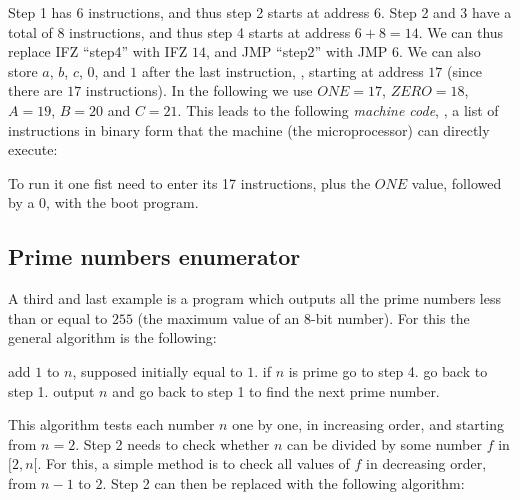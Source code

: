 Step 1 has $6$ instructions, and thus step 2 starts at address $6$. Step 2 and
3 have a total of $8$ instructions, and thus step 4 starts at address $6+8=14$.
We can thus replace IFZ ``step4'' with IFZ $14$, and JMP ``step2'' with JMP
$6$. We can also store $a$, $b$, $c$, $0$, and $1$ after the last instruction,
\ie, starting at address $17$ (since there are $17$ instructions). In the
following we use $\mathit{ONE}=17$, $\mathit{ZERO}=18$, $A=19$, $B=20$ and
$C=21$. This leads to the following {\em machine code}, \ie, a list of
instructions in binary form that the machine (the microprocessor) can directly
execute:



To run it one fist need to enter its 17 instructions, plus the $\mathit{ONE}$
value, followed by a $0$, with the boot program.

\subsection{Prime numbers enumerator}

A third and last example is a program which outputs all the prime numbers less
than or equal to $255$ (the maximum value of an 8-bit number). For this the
general algorithm is the following:

\begin{algorithmic}[1]
\State add $1$ to $n$, supposed initially equal to $1$.
\State if $n$ is prime go to step 4.
\State go back to step 1.
\State output $n$ and go back to step 1 to find the next prime number.
\end{algorithmic}

This algorithm tests each number $n$ one by one, in increasing order, and
starting from $n=2$. Step 2 needs to check whether $n$ can be divided by some
number $f$ in $[2,n[$. For this, a simple method is to check all values of $f$
in decreasing order, from $n-1$ to $2$. Step 2 can then be replaced with the
following algorithm:

